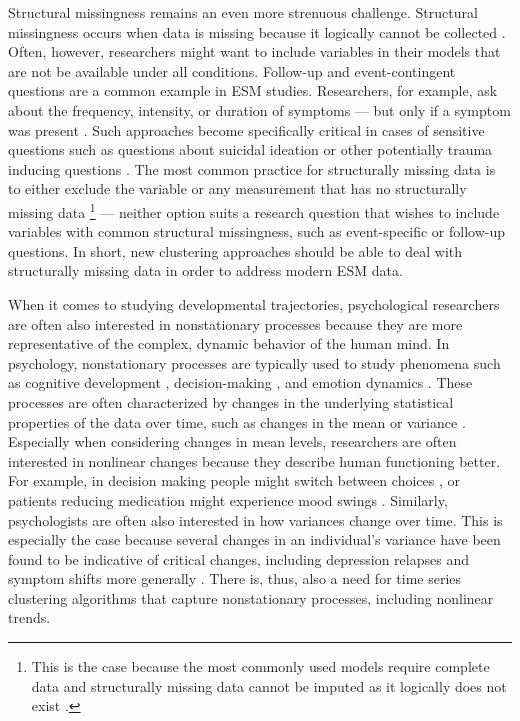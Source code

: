 \documentclass[man, 12pt, a4paper, mask]{apa7}
\theoremstyle{break}
\theoremstyle{plain}
\begin{document}
Structural missingness remains an even more strenuous challenge. Structural missingness occurs when data is missing because it logically cannot be collected \citep[as opposed to probabilistically missing data;][]{little2020, mclean2017}. Often, however, researchers might want to include variables in their models that are not be available under all conditions. Follow-up and event-contingent questions are a common example in ESM studies. Researchers, for example, ask about the frequency, intensity, or duration of symptoms --- but only if a symptom was present \citep{kivela2022}. Such approaches become specifically critical in cases of sensitive questions such as questions about suicidal ideation or other potentially trauma inducing questions \citep[e.g.,][]{glenn2022}. The most common practice for structurally missing data is to either exclude the variable or any measurement that has no structurally missing data \citep[e.g.,][]{lavori2008}\footnote{This is the case because the most commonly used models require complete data \citep{schafer2002} and structurally missing data cannot be imputed as it logically does not exist \citep[e.g.,][]{lavori2008}.} --- neither option suits a research question that wishes to include variables with common structural missingness, such as event-specific or follow-up questions. In short, new clustering approaches should be able to deal with structurally missing data in order to address modern ESM data.

When it comes to studying developmental trajectories, psychological researchers are often also interested in nonstationary processes because they are more representative of the complex, dynamic behavior of the human mind. In psychology, nonstationary processes are typically used to study phenomena such as cognitive development \citep[][]{quartz1997}, decision-making \citep[][]{ratcliff2016}, and emotion dynamics \citep[][]{bringmann2018b}. These processes are often characterized by changes in the underlying statistical properties of the data over time, such as changes in the mean or variance \citep[][]{molenaar2009}. Especially when considering changes in mean levels, researchers are often interested in nonlinear changes because they describe human functioning better. For example, in decision making people might switch between choices \citep[][]{ratcliff2016}, or patients reducing medication might experience mood swings \citep[][]{helmich2020a}. Similarly, psychologists are often also interested in how variances change over time. This is especially the case because several changes in an individual's variance have been found to be indicative of critical changes, including depression relapses and symptom shifts more generally \citep[e.g.,][]{schreuder2020, wichers2020}. There is, thus, also a need for time series clustering algorithms that capture nonstationary processes, including nonlinear trends.
\end{document}
